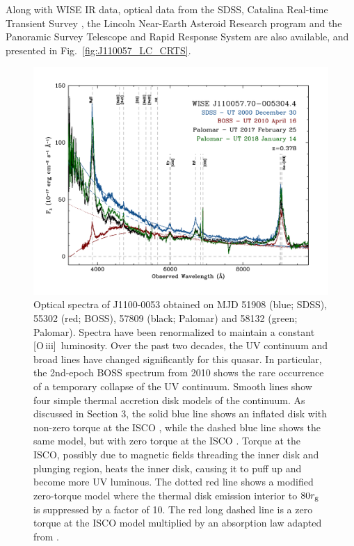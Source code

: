 \documentclass[a4paper,fleqn,usenatbib]{mnras}
\begin{document}
Along with WISE IR data, optical data from the SDSS, Catalina
Real-time Transient Survey \citep[CRTS;][]{Drake2009, Mahabal2011},
the Lincoln Near-Earth Asteroid Research \citep[LINEAR; ][]{Sesar2011}
program and the Panoramic Survey Telescope and Rapid Response System
\citep[PanSTARRS;][]{Kaiser2010, Stubbs2010, Tonry2012, Magnier2013}
are also available, and presented in Fig.~\ref{fig:J110057_LC_CRTS}.




\begin{figure}
  \centering
  \includegraphics[width=17.00cm, trim=0.0cm 0.0cm 0.0cm 0.0cm, clip]
  {w1100m0052_sdss2.pdf}
\vspace{-16pt}
  \caption[]{
    Optical spectra of J1100-0053 obtained on MJD 51908 (blue; SDSS),
    55302 (red; BOSS), 57809 (black; Palomar) and 58132 (green;
    Palomar). Spectra have been renormalized to maintain a constant
    [O\,{\sc iii}]\ luminosity. Over the past two decades, the UV
    continuum and broad lines have changed significantly for this quasar.
    In particular, the 2nd-epoch BOSS spectrum from 2010 shows the rare
    occurrence of a temporary collapse of the UV continuum.  Smooth lines
    show four simple thermal accretion disk models of the continuum.
    As discussed in Section 3, the 
    solid blue line shows an inflated disk with non-zero torque at the
    ISCO \cite[e.g.,][]{Sirko_Goodman2003}, while the dashed blue line
    shows the same model, but with zero torque at the ISCO \cite[i.e.,
    equivalent to a simple $\alpha$-disk model,][]{SS73}.  Torque at the
    ISCO, possibly due to magnetic fields threading the inner disk and
    plunging region, heats the inner disk, causing it to puff up and
    become more UV luminous.  The dotted red line shows a modified
    zero-torque model where the thermal disk emission interior to $80
    r_{\rm g}$ is suppressed by a factor of 10.
    The red long dashed line is a zero
    torque at the ISCO model multiplied by an absorption law adapted from
    \citet{Guo2016}.
}
  \label{fig:J110057_spectra}
\end{figure}
\end{document}
